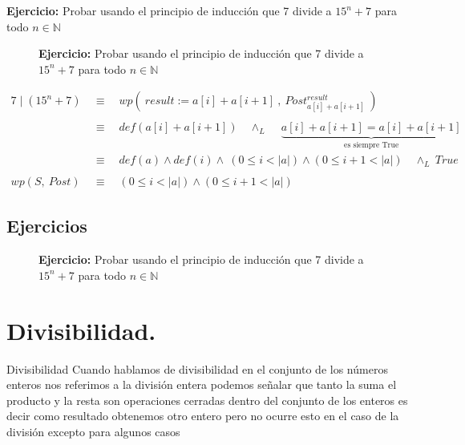 \documentclass[12pt]{book}
\begin{document}
\begin{shaded}
\textbf{Ejercicio: }
Probar usando el principio de inducción que 7 divide a $ 15^{n} + 7$ para todo $n \in \mathbb N $  
\end{shaded}

\begin{figure}
\vspace{-15pt}
\begin{shaded}
\textbf{Ejercicio: } Probar usando el principio de inducción que 7 divide a $ 15^{n} + 7$ para todo $n \in \mathbb N $  
\end{shaded}
\end{figure}

\begin{equation*}
\begin{split}
7\mid (15^{n} + 7) \  &\equiv \quad wp ( \ result  := a[i] + a[i+1] \ , \ Post^{result}_{a[i] + a[i+1]} \ )  \\ \\
&\equiv  \quad  def( a[i] + a[i+1]) \quad \wedge_{L} \quad \ \underbrace{a[i] + a[i+1] = a[i] + a[i+1]}_{\text{es siempre True}}  \\
&\equiv  \quad  def( a) \wedge def(i) \wedge \ ( 0 \leq i < \vert a \vert ) \wedge (0 \leq i+1 < \vert a \vert ) \quad      \wedge_{L} \ True  \\ \\
wp(S, \ Post) \ &\equiv  \quad  ( 0 \leq i < \vert a \vert ) \wedge (0 \leq i+1 < \vert a \vert )
\end{split}
\end{equation*}




\section{Ejercicios}


\begin{figure}
\vspace{-15pt}
\begin{shaded}
\textbf{Ejercicio: } Probar usando el principio de inducción que 7 divide a $ 15^{n} + 7$ para todo $n \in \mathbb N $  
\end{shaded}
\end{figure}


\chapter{Divisibilidad.}
Divisibilidad
Cuando hablamos de divisibilidad en el conjunto de los números enteros nos referimos a la división entera podemos señalar que tanto la suma el producto y la resta son operaciones cerradas dentro del conjunto de los enteros es decir como resultado obtenemos otro entero pero no ocurre esto en el caso de la división excepto para algunos casos 
\end{document}
